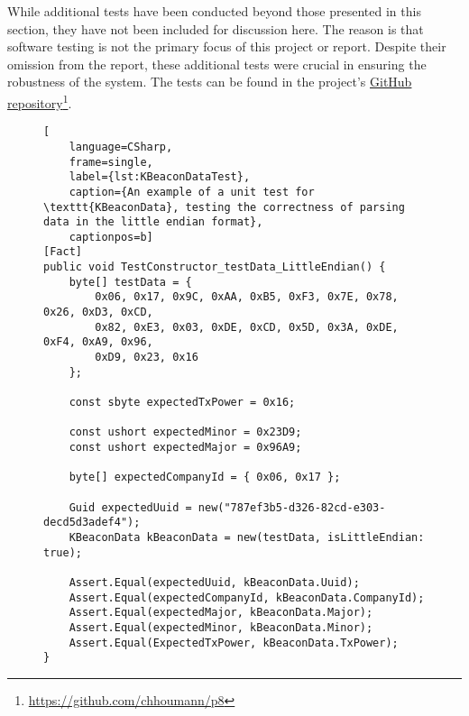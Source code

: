While additional tests have been conducted beyond those presented in this section, they have not been included for discussion here. 
The reason is that software testing is not the primary focus of this project or report.
Despite their omission from the report, these additional tests were crucial in ensuring the robustness of the system.
The tests can be found in the project's \href{https://github.com/chhoumann/p8}{GitHub repository}\footnote{\url{https://github.com/chhoumann/p8}}.


\begin{figure}[H]
\begin{lstlisting}[
	language=CSharp, 
	frame=single, 
	label={lst:KBeaconDataTest},
	caption={An example of a unit test for \texttt{KBeaconData}, testing the correctness of parsing data in the little endian format}, 
	captionpos=b] 
[Fact]
public void TestConstructor_testData_LittleEndian() {
	byte[] testData = { 
		0x06, 0x17, 0x9C, 0xAA, 0xB5, 0xF3, 0x7E, 0x78, 0x26, 0xD3, 0xCD, 
		0x82, 0xE3, 0x03, 0xDE, 0xCD, 0x5D, 0x3A, 0xDE, 0xF4, 0xA9, 0x96, 
		0xD9, 0x23, 0x16 
	};

	const sbyte expectedTxPower = 0x16;

	const ushort expectedMinor = 0x23D9;
	const ushort expectedMajor = 0x96A9;

	byte[] expectedCompanyId = { 0x06, 0x17 };

	Guid expectedUuid = new("787ef3b5-d326-82cd-e303-decd5d3adef4");
	KBeaconData kBeaconData = new(testData, isLittleEndian: true);

	Assert.Equal(expectedUuid, kBeaconData.Uuid);
	Assert.Equal(expectedCompanyId, kBeaconData.CompanyId);
	Assert.Equal(expectedMajor, kBeaconData.Major);
	Assert.Equal(expectedMinor, kBeaconData.Minor);
	Assert.Equal(ExpectedTxPower, kBeaconData.TxPower);
}
\end{lstlisting}
\end{figure}